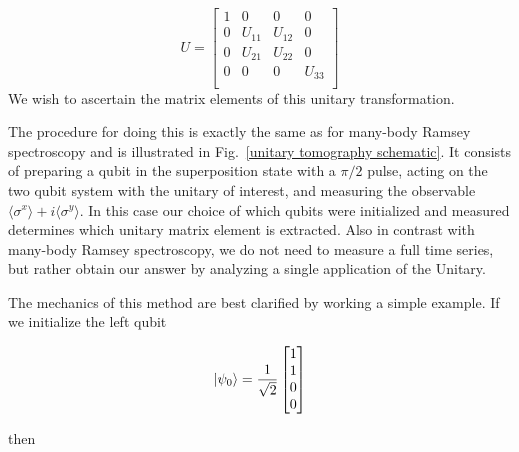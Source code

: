 \documentclass{article}
\begin{document}
    \begin{equation}
        U=
        \begin{bmatrix}
            1 & 0 & 0 & 0 \\
            0 & U_{11} & U_{12} & 0 \\
            0 & U_{21} & U_{22} & 0 \\
            0 & 0 & 0 & U_{33} \\
        \end{bmatrix}
    \end{equation}
    We wish to ascertain the matrix elements of this unitary transformation.

    The procedure for doing this is exactly the same as for many-body Ramsey spectroscopy and is illustrated in Fig.~\ref{unitary tomography schematic}.
    It consists of preparing a qubit in the superposition state with a $\pi / 2$ pulse,
    acting on the two qubit system with the unitary of interest,
    and measuring the observable $\langle \sigma^x \rangle + i \langle \sigma^y \rangle$.
    In this case our choice of which qubits were initialized and measured determines which unitary matrix element is extracted.
    Also in contrast with many-body Ramsey spectroscopy, we do not need to measure a full time series, but rather obtain our answer by analyzing a single application of the Unitary.



    The mechanics of this method are best clarified by working a simple example.
    If we initialize the left qubit

    \begin{equation}
        \ket{\psi_0}=\frac{1}{\sqrt{2}}
        \begin{bmatrix}
            1 \\
            1 \\
            0 \\
            0 \\
        \end{bmatrix}
    \end{equation}

    then
\end{document}
